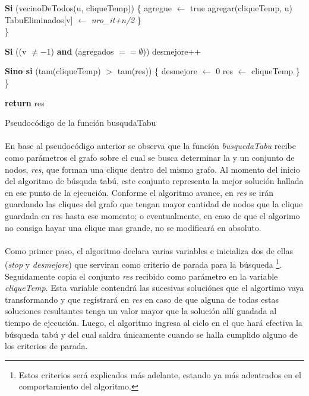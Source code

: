 \begin{algorithm}[H]
	\BlankLine		
	\tab \tab \textbf{Si} (vecinoDeTodos(u, cliqueTemp)) \{ 									
	\tab \tab \tab agregue $\leftarrow$ true													
	\tab \tab \tab agregar(cliqueTemp, u) 														
	\tab \tab \tab TabuEliminados[v] $\leftarrow$ \textit{nro\_it+n/2}							
	\tab \tab \} \\
	\tab \}

	\BlankLine \BlankLine		
	\tab \textbf{Si} ((v $\neq -1$) \textbf{and} (agregados $== \emptyset$)) 				
	\tab \tab desmejore++																		
	
	\BlankLine \BlankLine
	\tab \textbf{Sino si} (tam(cliqueTemp) $>$ tam(res)) \{										
	\tab \tab desmejore $\leftarrow$ 0															
	\tab \tab res $\leftarrow$ cliqueTemp														
	\tab \} \\
	\}
	
	\BlankLine \BlankLine		
	\textbf{return} res																			
\caption{Pseudocódigo de la función busqudaTabu} 
\normalsize
\end{algorithm}

\paragraph{}
En base al pseudocódigo anterior se observa que la función \textit{busquedaTabu} recibe como parámetros el grafo sobre el cual se busca determinar la \mc y un conjunto de nodos, \textit{res}, que forman una clique dentro del mismo grafo. Al momento del inicio del algoritmo de búsquda tabú, este conjunto representa la mejor solución hallada en ese punto de la ejecución. Conforme el algoritmo avance, en \textit{res} se irán guardando las cliques del grafo que tengan mayor cantidad de nodos que la clique guardada en res hasta ese momento; o eventualmente, en caso de que el algorimo no consiga hayar una clique mas grande, no se modificará en absoluto.

\paragraph{}
Como primer paso, el algoritmo declara varias variables e inicializa dos de ellas (\textit{stop} y \textit{desmejore}) que serviran como criterio de parada para la búsqueda \footnote{Estos criterios será explicados más adelante, estando ya más adentrados en el comportamiento del algoritmo.}. Seguidamente copia el conjunto \textit{res} recibido como parámetro en la variable \textit{cliqueTemp}. Esta variable contendrá las sucesivas soluciónes que el algortimo vaya transformando y que registrará en \textit{res} en caso de que alguna de todas estas soluciones resultantes tenga un valor mayor que la solución allí guadada al tiempo de ejecución. Luego, el algoritmo ingresa al ciclo en el que hará efectiva la búsqueda tabú y del cual saldra únicamente cuando se halla cumplido alguno de los criterios de parada.  

